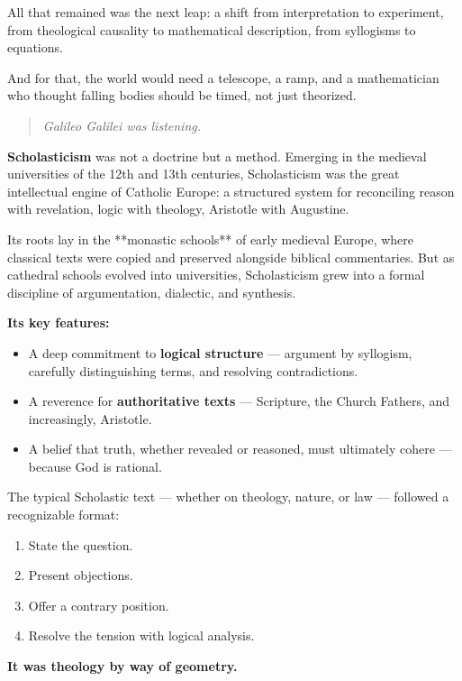 All that remained was the next leap: a shift from interpretation to experiment, from theological causality to mathematical description, from syllogisms to equations.

And for that, the world would need a telescope, a ramp, and a mathematician who thought falling bodies should be timed, not just theorized.

\begin{quote}
    \textit{Galileo Galilei was listening.}
\end{quote}

\begin{tcolorbox}[colback=gray!5!white, colframe=black!75!white, title={Historical Sidebar: Scholasticism — The Logic of Faith}]

    \textbf{Scholasticism} was not a doctrine but a method. Emerging in the medieval universities of the 12th and 13th centuries, Scholasticism was the great intellectual engine of Catholic Europe: a structured system for reconciling reason with revelation, logic with theology, Aristotle with Augustine.

    \medskip
    
    Its roots lay in the **monastic schools** of early medieval Europe, where classical texts were copied and preserved alongside biblical commentaries. But as cathedral schools evolved into universities, Scholasticism grew into a formal discipline of argumentation, dialectic, and synthesis.
    
    \medskip
    
    \textbf{Its key features:}

    \medskip

    \begin{itemize}
        \item A deep commitment to \textbf{logical structure} — argument by syllogism, carefully distinguishing terms, and resolving contradictions.
        \item A reverence for \textbf{authoritative texts} — Scripture, the Church Fathers, and increasingly, Aristotle.
        \item A belief that truth, whether revealed or reasoned, must ultimately cohere — because God is rational.
    \end{itemize}

    \medskip
    
    The typical Scholastic text — whether on theology, nature, or law — followed a recognizable format:

    \medskip
    
    \begin{enumerate}
        \item State the question.
        \item Present objections.
        \item Offer a contrary position.
        \item Resolve the tension with logical analysis.
    \end{enumerate}
    
    \medskip

    \textbf{It was theology by way of geometry.}
    
    
    \end{tcolorbox}
    

